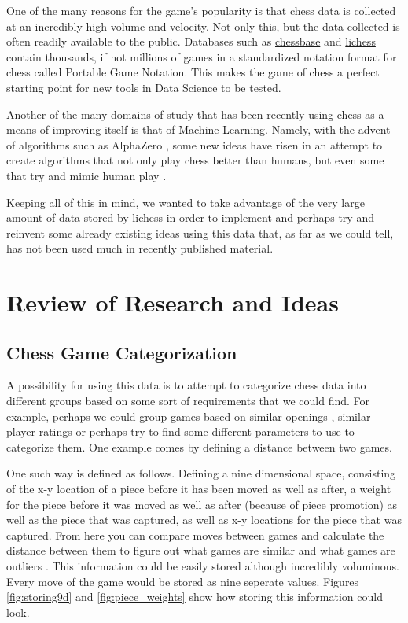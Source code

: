\documentclass[12pt]{article}
\begin{document}
    One of the many reasons for the game's popularity is that chess data is collected at an incredibly high volume and velocity. Not only this, but the data collected is often readily available to the public. Databases such as \href{https://database.chessbase.com/}{chessbase} and \href{https://database.lichess.org/}{lichess} contain thousands, if not millions of games in a standardized notation format for chess called Portable Game Notation. This makes the game of chess a perfect starting point for new tools in Data Science to be tested.

    Another of the many domains of study that has been recently using chess as a means of improving itself is that of Machine Learning. Namely, with the advent of algorithms such as AlphaZero \cite{alphazero}, some new ideas have risen in an attempt to create algorithms that not only play chess better than humans, but even some that try and mimic human play \cite{maiachess}.

    Keeping all of this in mind, we wanted to take advantage of the very large amount of data stored by \href{https://lichess.org/}{lichess} in order to implement and perhaps try and reinvent some already existing ideas using this data that, as far as we could tell, has not been used much in recently published material.
    
    \section{Review of Research and Ideas}

    \subsection{Chess Game Categorization}

    A possibility for using this data is to attempt to categorize chess data into different groups based on some sort of requirements that we could find. For example, perhaps we could group games based on similar openings \cite{eco}, similar player ratings or perhaps try to find some different parameters to use to categorize them. One example comes by defining a distance between two games.

    One such way is defined as follows. Defining a nine dimensional space, consisting of the x-y location of a piece before it has been moved as well as after, a weight for the piece before it was moved as well as after (because of piece promotion) as well as the piece that was captured, as well as x-y locations for the piece that was captured. From here you can compare moves between games and calculate the distance between them to figure out what games are similar and what games are outliers \cite{main}. This information could be easily stored although incredibly voluminous. Every move of the game would be stored as nine seperate values. Figures \ref{fig:storing9d} and \ref{fig:piece_weights} show how storing this information could look.
\end{document}
